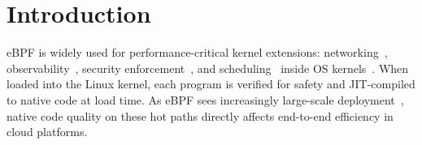 %
%
%
%
%

\section{Introduction}
\label{sec:introduction}

eBPF is widely used for performance-critical kernel extensions: networking~\cite{cilium,katran}, observability~\cite{tracee}, security enforcement~\cite{krsi}, and scheduling~\cite{sched_ext} inside OS kernels~\cite{Linux-ebpf, windows-ebpf}. When loaded into the Linux kernel, each program is verified for safety and JIT-compiled to native code at load time. As eBPF sees increasingly large-scale deployment~\cite{xxx,yyy}, native code quality on these hot paths directly affects end-to-end efficiency in cloud platforms.

